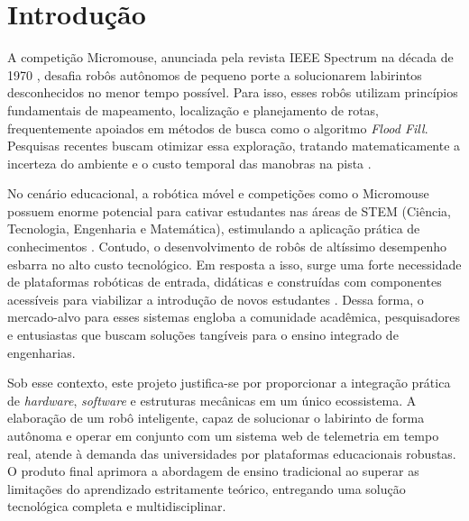 \chapter[Introdução]{Introdução}

A competição Micromouse, anunciada pela revista IEEE Spectrum na década de 1970 \cite{wikipedia_micromouse}, desafia robôs autônomos de pequeno porte a solucionarem labirintos desconhecidos no menor tempo possível. Para isso, esses robôs utilizam princípios fundamentais de mapeamento, localização e planejamento de rotas, frequentemente apoiados em métodos de busca como o algoritmo \textit{Flood Fill}. Pesquisas recentes buscam otimizar essa exploração, tratando matematicamente a incerteza do ambiente e o custo temporal das manobras na pista \cite{cai2012}.

No cenário educacional, a robótica móvel e competições como o Micromouse possuem enorme potencial para cativar estudantes nas áreas de STEM (Ciência, Tecnologia, Engenharia e Matemática), estimulando a aplicação prática de conhecimentos \cite{zawadniak2020}. Contudo, o desenvolvimento de robôs de altíssimo desempenho esbarra no alto custo tecnológico. Em resposta a isso, surge uma forte necessidade de plataformas robóticas de entrada, didáticas e construídas com componentes acessíveis para viabilizar a introdução de novos estudantes \cite{ukmars}. Dessa forma, o mercado-alvo para esses sistemas engloba a comunidade acadêmica, pesquisadores e entusiastas que buscam soluções tangíveis para o ensino integrado de engenharias.

Sob esse contexto, este projeto justifica-se por proporcionar a integração prática de \textit{hardware}, \textit{software} e estruturas mecânicas em um único ecossistema. A elaboração de um robô inteligente, capaz de solucionar o labirinto de forma autônoma e operar em conjunto com um sistema web de telemetria em tempo real, atende à demanda das universidades por plataformas educacionais robustas. O produto final aprimora a abordagem de ensino tradicional ao superar as limitações do aprendizado estritamente teórico, entregando uma solução tecnológica completa e multidisciplinar.